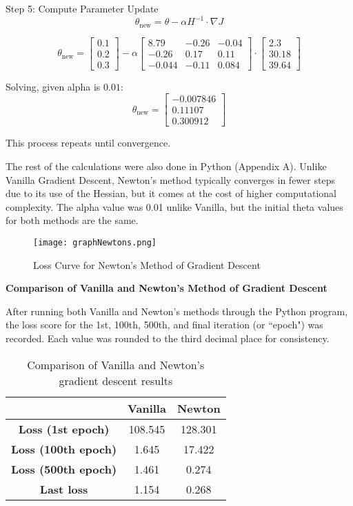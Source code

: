 \documentclass[12pt]{article}
\theoremstyle{definition}
\begin{document}
Step 5: Compute Parameter Update
\[
\theta_{\text{new}} = \theta - \alpha H^{-1} \cdot \nabla J
\]

\[
\theta_{\text{new}} =
\begin{bmatrix} 0.1 \\ 0.2 \\ 0.3 \end{bmatrix} - \alpha
\begin{bmatrix}
8.79 & -0.26 & -0.04 \\
-0.26 & 0.17 & 0.11 \\
-0.044 & -0.11 & 0.084
\end{bmatrix}
\cdot
\begin{bmatrix} 2.3 \\ 30.18 \\ 39.64 \end{bmatrix}
\]

Solving, given alpha is $0.01$:
\[
\theta_{\text{new}} = \begin{bmatrix} -0.007846\\ 0.11107\\ 0.300912 \end{bmatrix}
\]

This process repeats until convergence.

The rest of the calculations were also done in Python (Appendix A). Unlike Vanilla Gradient Descent, Newton’s method typically converges in fewer steps due to its use of the Hessian, but it comes at the cost of higher computational complexity. The alpha value was 0.01 unlike Vanilla, but the initial theta values for both methods are the same.

\begin{figure}[h]
    \centering
    \texttt{[image: graphNewtons.png]}
    \caption{Loss Curve for Newton's Method of Gradient Descent}
    \label{fig:enter-label}
\end{figure}

\begin{flushleft}
\textbf{Comparison of Vanilla and Newton's Method of Gradient Descent}
\end{flushleft}

After running both Vanilla and Newton's methods through the Python program, the loss score for the 1st, 100th, 500th, and final iteration (or ``epoch") was recorded. Each value was rounded to the third decimal place for consistency. 
\begin{table}[h]
    \centering
    \begin{tabular}{|c|c|c|}
        \hline
        & \textbf{Vanilla} & \textbf{Newton} \\ \hline
        \textbf{Loss (1st epoch)} & 108.545 & 128.301 \\ \hline
        \textbf{Loss (100th epoch)} & 1.645 & 17.422 \\ \hline
        \textbf{Loss (500th epoch)} & 1.461 & 0.274 \\ \hline
        \textbf{Last loss} & 1.154 & 0.268 \\ \hline
    \end{tabular}
    \caption{Comparison of Vanilla and Newton's gradient descent results}
    \label{tab:optimization_comparison}
\end{table}
\end{document}
